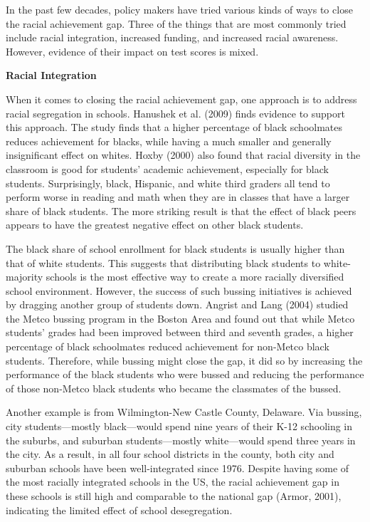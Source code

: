 \noindent In the past few decades, policy makers have tried various kinds of ways to close the racial achievement gap. Three of the things that are most commonly tried include racial integration, increased funding, and increased racial awareness. However, evidence of their impact on test scores is mixed.

\noindent\textbf{Racial Integration}

\noindent When it comes to closing the racial achievement gap, one approach is to address racial segregation in schools. Hanushek et al. (2009) finds evidence to support this approach. The study finds that a higher percentage of black schoolmates reduces achievement for blacks, while having a much smaller and generally insignificant effect on whites. Hoxby (2000) also found that racial diversity in the classroom is good for students’ academic achievement, especially for black students. Surprisingly, black, Hispanic, and white third graders all tend to perform worse in reading and math when they are in classes that have a larger share of black students. The more striking result is that the effect of black peers appears to have the greatest negative effect on other black students.

\noindent The black share of school enrollment for black students is usually higher than that of white students. This suggests that distributing black students to white-majority schools is the most effective way to create a more racially diversified school environment. However, the success of such bussing initiatives is achieved by dragging another group of students down. Angrist and Lang (2004) studied the Metco bussing program in the Boston Area and found out that while Metco students’ grades had been improved between third and seventh grades, a higher percentage of black schoolmates reduced achievement for non-Metco black students. Therefore, while bussing might close the gap, it did so by increasing the performance of the black students who were bussed and reducing the performance of those non-Metco black students who became the classmates of the bussed.

\noindent Another example is from Wilmington-New Castle County, Delaware. Via bussing, city students—mostly black—would spend nine years of their K-12 schooling in the suburbs, and suburban students—mostly white—would spend three years in the city. As a result, in all four school districts in the county, both city and suburban schools have been well-integrated since 1976. Despite having some of the most racially integrated schools in the US, the racial achievement gap in these schools is still high and comparable to the national gap (Armor, 2001), indicating the limited effect of school desegregation.

